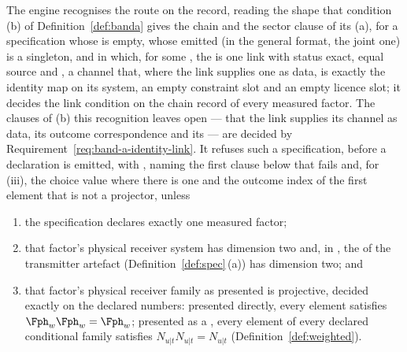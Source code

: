 \begin{requirement}\label{req:band-a-ideal-receiver}
The engine recognises the  route on the record, reading the
shape that condition (b) of Definition~\ref{def:banda} gives the chain and
the sector clause of its (a), for a specification whose  is
empty, whose emitted  (in the general format, the joint one) is a singleton, and
in which, for some , the  is one
link with status exact, equal source and
, a channel that, where the link
supplies one as data, is exactly the identity map on its system, an empty
constraint slot and an empty licence slot; it decides the link condition on
the chain record of every measured factor. The clauses of (b) this
recognition leaves open --- that the link supplies its channel as data, its
outcome correspondence and its  --- are
decided by Requirement~\ref{req:band-a-identity-link}. It refuses such a
specification, before a declaration is emitted, with
, naming the first clause below that
fails and, for (iii), the choice value where there is one and the outcome
index of the first element that is not a projector, unless
\begin{enumerate}[label=(\roman*),leftmargin=2.2em]
\item the specification declares exactly one measured factor;
\item that factor's physical receiver system has dimension two and, in
  , the  of the
  transmitter artefact (Definition~\ref{def:spec}\,(a)) has dimension two; and
\item that factor's physical receiver family as presented is projective,
  decided exactly on the declared numbers: presented directly, every element
  satisfies $\Fph_w\Fph_w=\Fph_w$; presented as a
  , every element of every declared conditional
  family satisfies $N_{u|t}N_{u|t}=N_{u|t}$
  (Definition~\ref{def:weighted}).
\end{enumerate}
\end{requirement}
